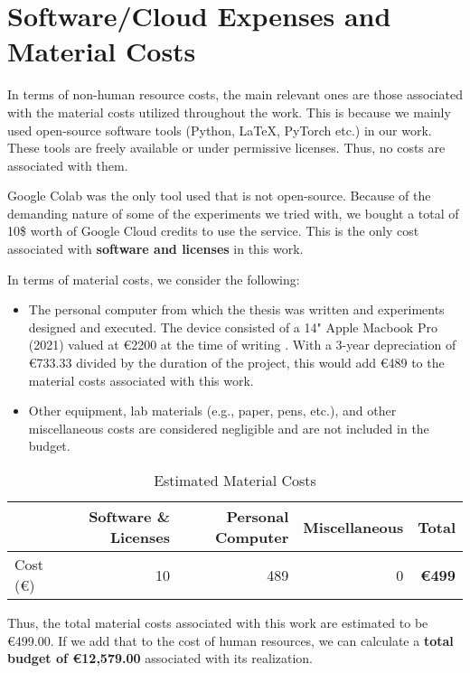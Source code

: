 
\section{Software/Cloud Expenses and Material Costs}

In terms of non-human resource costs, the main relevant ones are those associated with the material costs utilized throughout the work. This is because we mainly used open-source software tools (Python, LaTeX, PyTorch etc.) in our work. These tools are freely available or under permissive licenses. Thus, no costs are associated with them.

Google Colab was the only tool used that is not open-source. Because of the demanding nature of some of the experiments we tried with, we bought a total of 10\$ worth of Google Cloud credits to use the service. This is the only cost associated with \textbf{software and licenses} in this work.

In terms of material costs, we consider the following:

\begin{itemize}
    \item The personal computer from which the thesis was written and experiments designed and executed. The device consisted of a 14" Apple Macbook Pro (2021) valued at €2200 at the time of writing \cite{apple_comprar_2022}. With a 3-year depreciation of €733.33 divided by the duration of the project, this would add €489 to the material costs associated with this work.
    \item Other equipment, lab materials (e.g., paper, pens, etc.), and other miscellaneous costs are considered negligible and are not included in the budget.
\end{itemize}


\begin{table}[H]
    \centering
    \captionsetup[]{}
    \caption{Estimated Material Costs}
    \label{tab:budget-material_costs}
    \begin{tabular}{lrrrr}
    \toprule
    {} &  Software \& Licenses &  Personal Computer & Miscellaneous  & \textbf{Total} \\
    \midrule
    Cost (€)  &  10 & 489 &  0 & \textbf{€499} \\
    \end{tabular}
\end{table}

Thus, the total material costs associated with this work are estimated to be €499.00. If we add that to the cost of human resources, we can calculate a \textbf{total budget of €12,579.00} associated with its realization.